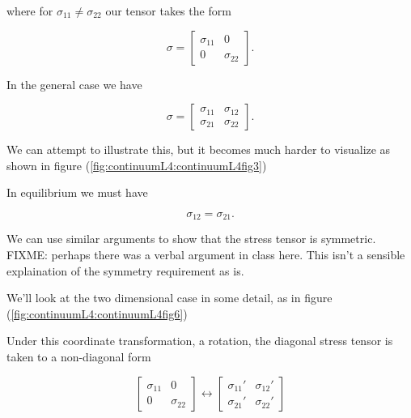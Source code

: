 where for $\sigma_{11} \ne \sigma_{22}$ our tensor takes the form

\begin{equation}\label{eqn:continuumL4:50}
\sigma = 
\begin{bmatrix}
\sigma_{11} & 0 \\
0 & \sigma_{22}
\end{bmatrix}.
\end{equation}

In the general case we have

\begin{equation}\label{eqn:continuumL4:70}
\sigma = 
\begin{bmatrix}
\sigma_{11} & \sigma_{12} \\
\sigma_{21} & \sigma_{22}
\end{bmatrix}.
\end{equation}

We can attempt to illustrate this, but it becomes much harder to visualize as shown in figure (\ref{fig:continuumL4:continuumL4fig3})

In equilibrium we must have

\begin{equation}\label{eqn:continuumL4:90}
\sigma_{12} = \sigma_{21}.
\end{equation}

We can use similar arguments to show that the stress tensor is symmetric.
FIXME: perhaps there was a verbal argument in class here.  This isn't a sensible explaination of the symmetry requirement as is.

We'll look at the two dimensional case in some detail, as in figure (\ref{fig:continuumL4:continuumL4fig6})


Under this coordinate transformation, a rotation, the diagonal stress tensor is taken to a non-diagonal form 

\begin{equation}\label{eqn:continuumL4:130}
\begin{bmatrix}
\sigma_{11} & 0 \\
0 & \sigma_{22} 
\end{bmatrix}
\leftrightarrow
\begin{bmatrix}
\sigma_{11}' & \sigma_{12}' \\
\sigma_{21}' & \sigma_{22}' 
\end{bmatrix}
\end{equation}
